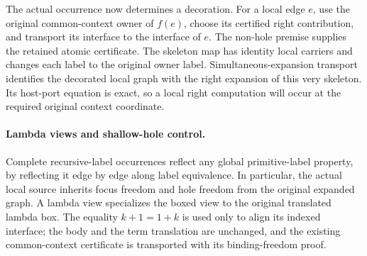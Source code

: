 

\par{}




\par{}

The actual occurrence now determines a decoration. For a local edge $e$,
use the original common-context owner of $f(e)$, choose its certified right
contribution, and transport its interface to the interface of $e$. The
non-hole premise supplies the retained atomic certificate. The skeleton
map has identity local carriers and changes each label to the original
owner label. Simultaneous-expansion transport identifies the decorated
local graph with the right expansion of this very skeleton. Its host-port
equation is exact, so a local right computation will occur at the required
original context coordinate.





\paragraph{Lambda views and shallow-hole control.}
Complete recursive-label occurrences reflect any global primitive-label
property, by reflecting it edge by edge along label equivalence. In
particular, the actual local source inherits focus freedom and hole freedom
from the original expanded graph. A lambda view specializes the boxed view
to the original translated lambda box. The equality $k+1=1+k$ is used only
to align its indexed interface; the body and the term translation are
unchanged, and the existing common-context certificate is transported with
its binding-freedom proof.

